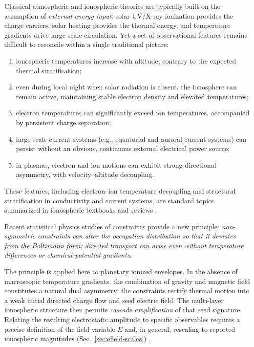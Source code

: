\documentclass[11pt,a4paper]{article}
\begin{document}
Classical atmospheric and ionospheric theories are typically built on the assumption of \emph{external energy input}: solar UV/X-ray ionization provides the charge carriers, solar heating provides the thermal energy, and temperature gradients drive large-scale circulation. Yet a set of observational features remains difficult to reconcile within a single traditional picture:
\begin{enumerate}
  \item ionospheric temperatures increase with altitude, contrary to the expected thermal stratification;
  \item even during local night when solar radiation is absent, the ionosphere can remain active, maintaining stable electron density and elevated temperatures;
  \item electron temperatures can significantly exceed ion temperatures, accompanied by persistent charge separation;
  \item large-scale current systems (e.g., equatorial and auroral current systems) can persist without an obvious, continuous external electrical power source;
  \item in plasmas, electron and ion motions can exhibit strong directional asymmetry, with velocity--altitude decoupling.
\end{enumerate}
These features, including electron--ion temperature decoupling and structural stratification in conductivity and current systems, are standard topics summarized in ionospheric textbooks and reviews \cite{Kelley2009EarthIonosphere,SchunkNagy2009IonospherePhysics}.

Recent statistical physics studies of constraints \cite{peng2026entropydirectionmirrorstateparadox} provide a new principle: \emph{non-symmetric constraints can alter the occupation distribution so that it deviates from the Boltzmann form; directed transport can arise even without temperature differences or chemical-potential gradients}.

The principle is applied here to planetary ionized envelopes. In the absence of macroscopic temperature gradients, the combination of gravity and magnetic field constitutes a natural dual asymmetry: the constraints rectify thermal motion into a weak initial directed charge flow and seed electric field. The multi-layer ionospheric structure then permits \emph{cascade amplification} of that seed signature. Relating the resulting electrostatic amplitude to specific observables requires a precise definition of the field variable $E$ and, in general, rescaling to reported ionospheric magnitudes (Sec.~\ref{sec:efield-scales}) \cite{Kelley2009EarthIonosphere,SchunkNagy2009IonospherePhysics}.
\end{document}
